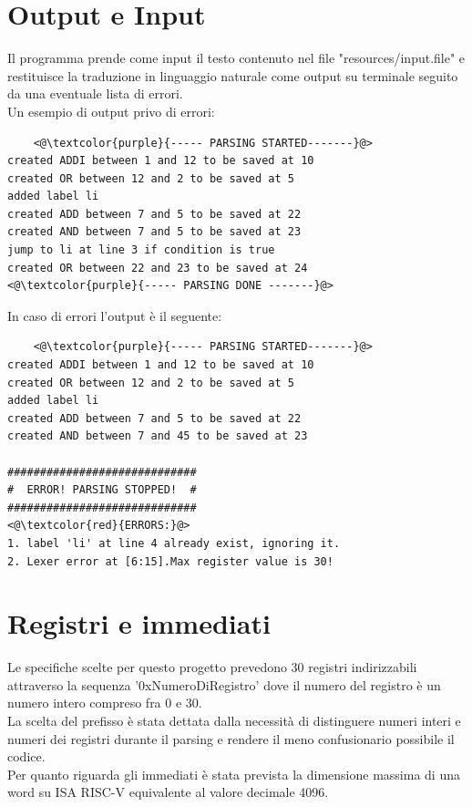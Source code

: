 \section{Output e Input}
Il programma prende come input il testo contenuto nel file "resources/input.file" e restituisce la traduzione in linguaggio naturale come output su terminale seguito da una eventuale lista di errori.
\\Un esempio di output privo di errori:
\begin{lstlisting}
    <@\textcolor{purple}{----- PARSING STARTED-------}@>
created ADDI between 1 and 12 to be saved at 10
created OR between 12 and 2 to be saved at 5
added label li
created ADD between 7 and 5 to be saved at 22
created AND between 7 and 5 to be saved at 23
jump to li at line 3 if condition is true
created OR between 22 and 23 to be saved at 24
<@\textcolor{purple}{----- PARSING DONE -------}@>
\end{lstlisting}
In caso di errori l'output è il seguente:
\begin{lstlisting}
    <@\textcolor{purple}{----- PARSING STARTED-------}@>
created ADDI between 1 and 12 to be saved at 10
created OR between 12 and 2 to be saved at 5
added label li
created ADD between 7 and 5 to be saved at 22
created AND between 7 and 45 to be saved at 23

#############################
#  ERROR! PARSING STOPPED!  #
#############################
<@\textcolor{red}{ERRORS:}@>
1. label 'li' at line 4 already exist, ignoring it.
2. Lexer error at [6:15].Max register value is 30!
\end{lstlisting}






\section{Registri e immediati}
Le specifiche scelte per questo progetto prevedono 30 registri indirizzabili attraverso la sequenza '0xNumeroDiRegistro' dove il numero del registro è un numero intero compreso fra 0 e 30.
\\La scelta del prefisso è stata dettata dalla necessità di distinguere numeri interi e numeri dei registri durante il parsing e rendere il meno confusionario possibile il codice.
\\Per quanto riguarda gli immediati è stata prevista la dimensione massima di una word su ISA RISC-V equivalente al valore decimale 4096.
